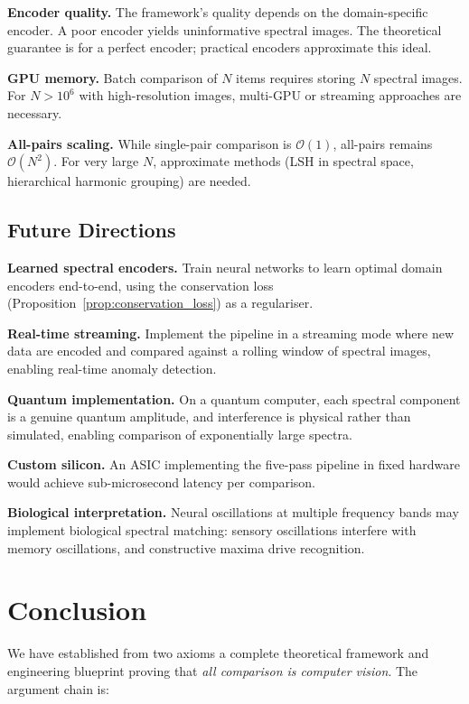 \documentclass[11pt,twocolumn,a4paper]{article}
\newcommand{\BigO}{\mathcal{O}}
\begin{document}
\textbf{Encoder quality.} The framework's quality depends on the
domain-specific encoder. A poor encoder yields uninformative spectral
images. The theoretical guarantee is for a perfect encoder; practical
encoders approximate this ideal.

\textbf{GPU memory.} Batch comparison of $N$ items requires storing
$N$ spectral images. For $N > 10^6$ with high-resolution images,
multi-GPU or streaming approaches are necessary.

\textbf{All-pairs scaling.} While single-pair comparison is $\BigO(1)$,
all-pairs remains $\BigO(N^2)$. For very large $N$, approximate
methods (LSH in spectral space, hierarchical harmonic grouping) are
needed.

\subsection{Future Directions}

\textbf{Learned spectral encoders.} Train neural networks to learn
optimal domain encoders end-to-end, using the conservation loss
(Proposition~\ref{prop:conservation_loss}) as a regulariser.

\textbf{Real-time streaming.} Implement the pipeline in a streaming
mode where new data are encoded and compared against a rolling window
of spectral images, enabling real-time anomaly detection.

\textbf{Quantum implementation.} On a quantum computer, each spectral
component is a genuine quantum amplitude, and interference is physical
rather than simulated, enabling comparison of exponentially large spectra.

\textbf{Custom silicon.} An ASIC implementing the five-pass pipeline in
fixed hardware would achieve sub-microsecond latency per comparison.

\textbf{Biological interpretation.} Neural oscillations at multiple
frequency bands \citep{buzsaki2006} may implement biological spectral
matching: sensory oscillations interfere with memory oscillations, and
constructive maxima drive recognition.


\section{Conclusion}
\label{sec:conclusion}

We have established from two axioms a complete theoretical framework
and engineering blueprint proving that \emph{all comparison is computer
vision}. The argument chain is:
\end{document}
